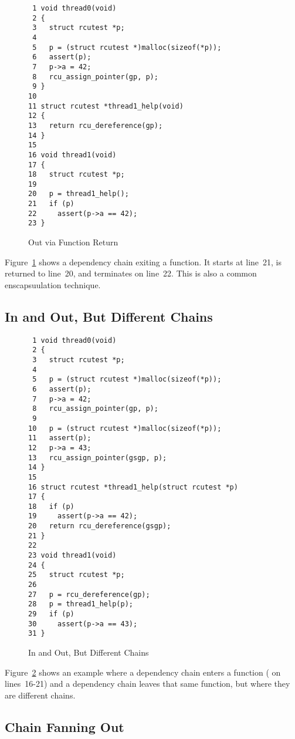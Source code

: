 \documentclass[letterpaper,twocolumn,10pt]{article}
\begin{document}
\begin{figure}[tbp]
{ \scriptsize
\begin{verbatim}
 1 void thread0(void)
 2 {
 3   struct rcutest *p;
 4
 5   p = (struct rcutest *)malloc(sizeof(*p));
 6   assert(p);
 7   p->a = 42;
 8   rcu_assign_pointer(gp, p);
 9 }
10
11 struct rcutest *thread1_help(void)
12 {
13   return rcu_dereference(gp);
14 }
15
16 void thread1(void)
17 {
18   struct rcutest *p;
19
20   p = thread1_help();
21   if (p)
22     assert(p->a == 42);
23 }
\end{verbatim}
}
\caption{Out via Function Return}
\label{fig:Out via Function Return}
\end{figure}

Figure~\ref{fig:Out via Function Return}
shows a dependency chain exiting a function.
It starts at line~21, is returned to line~20, and
terminates on line~22.
This is also a common enscapsuulation technique.

\subsection{In and Out, But Different Chains}
\label{sec:In and Out, But Different Chains}

\begin{figure}[tbp]
{ \scriptsize
\begin{verbatim}
 1 void thread0(void)
 2 {
 3   struct rcutest *p;
 4
 5   p = (struct rcutest *)malloc(sizeof(*p));
 6   assert(p);
 7   p->a = 42;
 8   rcu_assign_pointer(gp, p);
 9
10   p = (struct rcutest *)malloc(sizeof(*p));
11   assert(p);
12   p->a = 43;
13   rcu_assign_pointer(gsgp, p);
14 }
15
16 struct rcutest *thread1_help(struct rcutest *p)
17 {
18   if (p)
19     assert(p->a == 42);
20   return rcu_dereference(gsgp);
21 }
22
23 void thread1(void)
24 {
25   struct rcutest *p;
26
27   p = rcu_dereference(gp);
28   p = thread1_help(p);
29   if (p)
30     assert(p->a == 43);
31 }
\end{verbatim}
}
\caption{In and Out, But Different Chains}
\label{fig:In and Out, But Different Chains}
\end{figure}

Figure~\ref{fig:In and Out, But Different Chains}
shows an example where a dependency chain enters a function
( on lines~16-21)
and a dependency chain leaves that same function,
but where they are different chains.

\subsection{Chain Fanning Out}
\label{sec:Chain Fanning Out}
\end{document}
